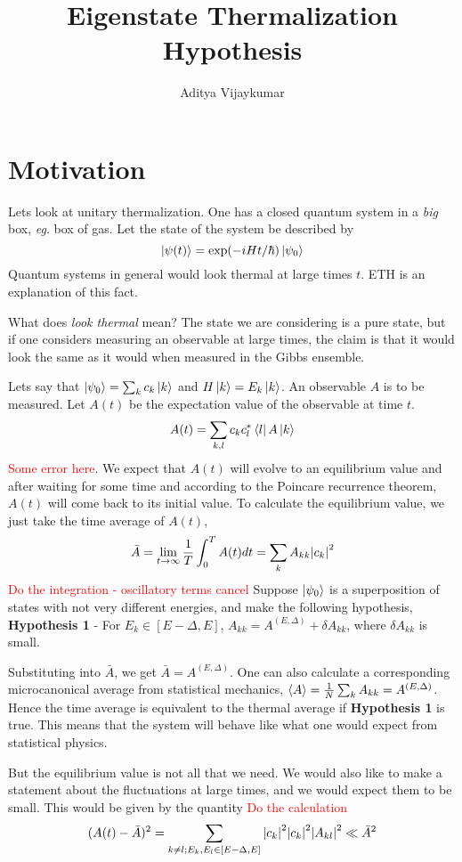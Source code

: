\documentclass[a4paper,11pt]{article}
\title{\textbf{Eigenstate Thermalization Hypothesis}}
\author{Aditya Vijaykumar}
\affiliation{International Centre for Theoretical Sciences, Bengaluru, India.}
\begin{document}
\maketitle
\section{Motivation}
Lets look at unitary thermalization. One has a closed quantum system in a \textit{big} box, \textit{eg}. box of gas. Let the state of the system be described by 
$$\ket{\psi(t)} = \exp(-i H t/\hbar ) \ket{\psi_0}$$ Quantum systems in general would look thermal at large times $t$. ETH is an explanation of this fact.

What does \textit{look thermal} mean? The state we are considering is a pure state, but if one considers measuring an observable at large times, the claim is that it would look the same as it would when measured in the Gibbs ensemble.

Lets say that $\ket{\psi_0} = \sum_{k} c_k \ket{k}$ and $H\ket{k} = E_k \ket{k}$. An observable $A$ is to be measured. Let $A(t)$ be the expectation value of the observable at time $t$.
$$A(t)  = \sum_{k,l}c_k c_l^* \bra{l}A \ket{k}$$ \textcolor{red}{Some error here}. We expect that $A(t)$ will evolve to an equilibrium value and after waiting for some time and according to the Poincare recurrence theorem, $A(t)$ will come back to its initial value. To calculate the equilibrium value, we just take the time average of $A(t)$,
$$\bar{A}=\lim\limits_{t \rightarrow \infty} \frac{1}{T}\int_{0}^{T} A(t) dt = \sum_{k} A_{kk}\abs{c_k}^2$$
\textcolor{red}{Do the integration - oscillatory terms cancel}
Suppose $\ket{\psi_0}$ is a superposition of states with not very different energies, and make the following hypothesis,\\
\textbf{Hypothesis 1} - For $E_k \in [E-\Delta, E]$, $A_{kk} = A^{(E,\Delta)} + \delta A_{kk}$, where $\delta A_{kk}$ is small.

Substituting into $\bar{A}$, we get $\bar{A} = A^{(E,\Delta)}$. One can also calculate a corresponding microcanonical average from statistical mechanics, $\expval{A} = \frac{1}{N}\sum_{k} A_{kk}= A^{(E,\Delta)}$. Hence the time average is equivalent to the thermal average if \textbf{Hypothesis 1} is true. This means that the system will behave like what one would expect from statistical physics. 

But the equilibrium value is not all that we need. We would also like to make a statement about the fluctuations at large times, and we would expect them to be small. This would be given by the quantity \textcolor{red}{Do the calculation}$$(A(t) - \bar{A})^2 = \sum_{k\ne l; E_k, E_l \in [E-\Delta,E]} \abs{c_k}^2 \abs{c_k}^2 \abs{A_{kl}}^2 \ll \bar{A}^2$$
\end{document}
